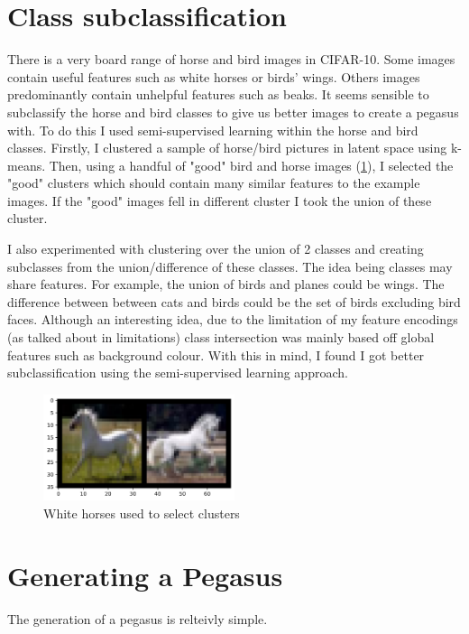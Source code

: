 \documentclass{article}
\begin{document}
\section{Class subclassification}
There is a very board range of horse and bird images in CIFAR-10. Some images contain useful features such as white horses or birds' wings. Others images predominantly contain unhelpful features such as beaks. It seems sensible to subclassify the horse and bird classes to give us better images to create a pegasus with. To do this I used semi-supervised learning within the horse and bird classes. Firstly, I clustered a sample of horse/bird pictures in latent space using k-means. Then, using a handful of "good" bird and horse images (\ref{fig:good_horses}), I selected the "good" clusters which should contain many similar features to the example images. If the "good" images fell in different cluster I took the union of these cluster.

I also experimented with clustering over the union of 2 classes and creating subclasses from the union/difference of these classes. The idea being classes may share features. For example, the union of birds and planes could be wings. The difference between between cats and birds could be the set of birds excluding bird faces. Although an interesting idea, due to the limitation of my feature encodings (as talked about in limitations) class intersection was mainly based off global features such as background colour. With this in mind, I found I got better subclassification using the semi-supervised learning approach.

\begin{figure}
    \begin{center}
        \includegraphics[width=0.5\textwidth]{figures/good_horses.png}
    \end{center}
    \caption{White horses used to select clusters}
    \label{fig:good_horses}
\end{figure}

\section{Generating a Pegasus}
The generation of a pegasus is relteivly simple. 
\end{document}

